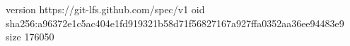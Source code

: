 version https://git-lfs.github.com/spec/v1
oid sha256:a96372e1c5ac404e1fd919321b58d71f56827167a927ffa0352aa36ee94483e9
size 176050
